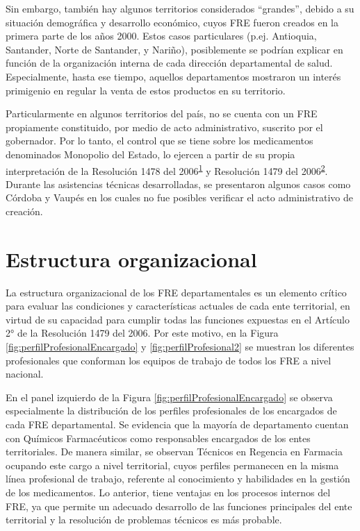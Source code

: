 \documentclass[
]{book}
\begin{document}
Sin embargo, también hay algunos territorios considerados ``grandes'', debido a su situación demográfica y desarrollo económico, cuyos FRE fueron creados en la primera parte de los años 2000. Estos casos particulares (p.ej. Antioquia, Santander, Norte de Santander, y Nariño), posiblemente se podrían explicar en función de la organización interna de cada dirección departamental de salud. Especialmente, hasta ese tiempo, aquellos departamentos mostraron un interés primigenio en regular la venta de estos productos en su territorio.

Particularmente en algunos territorios del país, no se cuenta con un FRE propiamente constituido, por medio de acto administrativo, suscrito por el gobernador. Por lo tanto, el control que se tiene sobre los medicamentos denominados Monopolio del Estado, lo ejercen a partir de su propia interpretación de la Resolución 1478 del 2006\textsuperscript{\protect\hyperlink{ref-MSPS1478-2006}{1}} y Resolución 1479 del 2006\textsuperscript{\protect\hyperlink{ref-MSPS1479-2006}{2}}. Durante las asistencias técnicas desarrolladas, se presentaron algunos casos como Córdoba y Vaupés en los cuales no fue posibles verificar el acto administrativo de creación.

\hypertarget{estructura-organizacional}{%
\section{Estructura organizacional}\label{estructura-organizacional}}

La estructura organizacional de los FRE departamentales es un elemento crítico para evaluar las condiciones y características actuales de cada ente territorial, en virtud de su capacidad para cumplir todas las funciones expuestas en el Artículo 2° de la Resolución 1479 del 2006. Por este motivo, en la Figura \ref{fig:perfilProfesionalEncargado} y \ref{fig:perfilProfesional2} se muestran los diferentes profesionales que conforman los equipos de trabajo de todos los FRE a nivel nacional.

En el panel izquierdo de la Figura \ref{fig:perfilProfesionalEncargado} se observa especialmente la distribución de los perfiles profesionales de los encargados de cada FRE departamental. Se evidencia que la mayoría de departamento cuentan con Químicos Farmacéuticos como responsables encargados de los entes territoriales. De manera similar, se observan Técnicos en Regencia en Farmacia ocupando este cargo a nivel territorial, cuyos perfiles permanecen en la misma línea profesional de trabajo, referente al conocimiento y habilidades en la gestión de los medicamentos. Lo anterior, tiene ventajas en los procesos internos del FRE, ya que permite un adecuado desarrollo de las funciones principales del ente territorial y la resolución de problemas técnicos es más probable.
\end{document}
